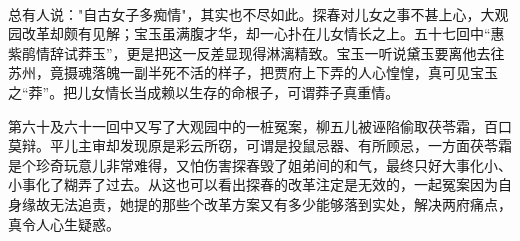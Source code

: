 %
\begin{solution}
    \

    \large 总有人说："自古女子多痴情"，其实也不尽如此。探春对儿女之事不甚上心，大观园改革却颇有见解；宝玉虽满腹才华，却一心扑在儿女情长之上。五十七回中“惠紫鹃情辞试莽玉”，更是把这一反差显现得淋漓精致。宝玉一听说黛玉要离他去往苏州，竟摄魂落魄一副半死不活的样子，把贾府上下弄的人心惶惶，真可见宝玉之“莽”。把儿女情长当成赖以生存的命根子，可谓莽子真重情。

    第六十及六十一回中又写了大观园中的一桩冤案，柳五儿被诬陷偷取茯苓霜，百口莫辩。平儿主审却发现原是彩云所窃，可谓是投鼠忌器、有所顾忌，一方面茯苓霜是个珍奇玩意儿非常难得，又怕伤害探春毁了姐弟间的和气，最终只好大事化小、小事化了糊弄了过去。从这也可以看出探春的改革注定是无效的，一起冤案因为自身缘故无法追责，她提的那些个改革方案又有多少能够落到实处，解决两府痛点，真令人心生疑惑。
\end{solution}


%



%



%



